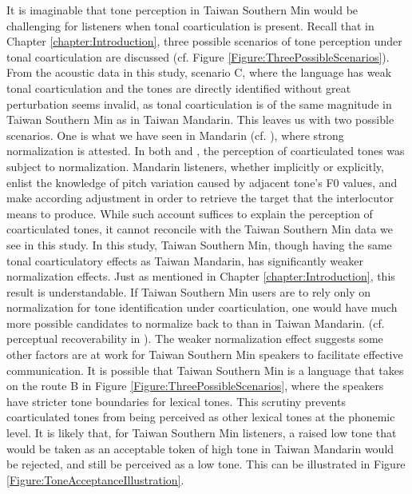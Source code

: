 It is imaginable that tone perception in Taiwan Southern Min would be challenging for listeners when tonal coarticulation is present. Recall that in Chapter \ref{chapter:Introduction}, three possible scenarios of tone perception under tonal coarticulation are discussed (cf. Figure \ref{Figure:ThreePossibleScenarios}). From the acoustic data in this study, scenario C, where the language has weak tonal coarticulation and the tones are directly identified without great perturbation seems invalid, as tonal coarticulation is of the same magnitude in Taiwan Southern Min as in Taiwan Mandarin. This leaves us with two possible scenarios. One is what we have seen in Mandarin (cf. \citealp{Zhangetal2022}), where strong normalization is attested. In both \cite{Xu1994} and \citeauthor{Zhangetal2022}, the perception of coarticulated tones was subject to normalization. Mandarin listeners, whether implicitly or explicitly, enlist the knowledge of pitch variation caused by adjacent tone's F0 values, and make according adjustment in order to retrieve the target that the interlocutor means to produce. While such account suffices to explain the perception of coarticulated tones, it cannot reconcile with the Taiwan Southern Min data we see in this study. In this study, Taiwan Southern Min, though having the same tonal coarticulatory effects as Taiwan Mandarin, has significantly weaker normalization effects. Just as mentioned in Chapter \ref{chapter:Introduction}, this result is understandable. If Taiwan Southern Min users are to rely only on normalization for tone identification under coarticulation, one would have much more possible candidates to normalize back to than in Taiwan Mandarin. (cf. perceptual recoverability in \citealp{Flemming2011}). The weaker normalization effect suggests some other factors are at work for Taiwan Southern Min speakers to facilitate effective communication. It is possible that Taiwan Southern Min is a language that takes on the route B in Figure \ref{Figure:ThreePossibleScenarios}, where the speakers have stricter tone boundaries for lexical tones. This scrutiny prevents coarticulated tones from being perceived as other lexical tones at the phonemic level. It is likely that, for Taiwan Southern Min listeners, a raised low tone that would be taken as an acceptable token of high tone in Taiwan Mandarin would be rejected, and still be perceived as a low tone. This can be illustrated in Figure \ref{Figure:ToneAcceptanceIllustration}. 
